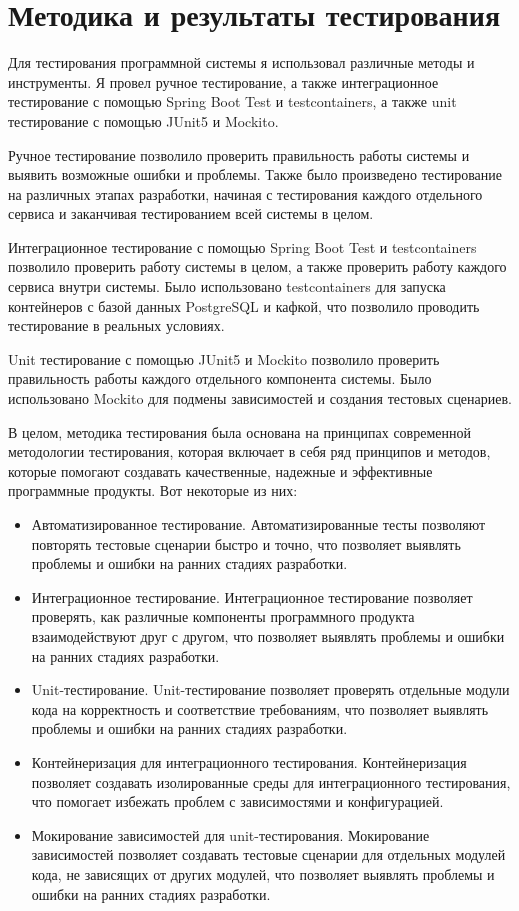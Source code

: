 \section{Методика и результаты тестирования}

Для тестирования программной системы я использовал различные методы и инструменты. Я провел ручное тестирование, а также интеграционное тестирование с помощью Spring Boot Test и testcontainers, а также unit тестирование с помощью JUnit5 и Mockito.

Ручное тестирование позволило проверить правильность работы системы и выявить возможные ошибки и проблемы. Также было произведено тестирование на различных этапах разработки, начиная с тестирования каждого отдельного сервиса и заканчивая тестированием всей системы в целом.

Интеграционное тестирование с помощью Spring Boot Test и testcontainers позволило проверить работу системы в целом, а также проверить работу каждого сервиса внутри системы. Было использовано testcontainers для запуска контейнеров с базой данных PostgreSQL и кафкой, что позволило проводить тестирование в реальных условиях.

Unit тестирование с помощью JUnit5 и Mockito позволило проверить правильность работы каждого отдельного компонента системы. Было использовано Mockito для подмены зависимостей и создания тестовых сценариев.

В целом, методика тестирования была основана на принципах современной методологии тестирования, которая включает
в себя ряд принципов и методов,
которые помогают создавать качественные, надежные и эффективные программные
продукты. Вот некоторые из них:

\begin{itemize}
    \item Автоматизированное тестирование. Автоматизированные тесты позволяют повторять тестовые сценарии быстро и точно, что позволяет выявлять проблемы и ошибки на ранних стадиях разработки.
    \item Интеграционное тестирование. Интеграционное тестирование позволяет проверять, как различные компоненты программного продукта взаимодействуют друг с другом, что позволяет выявлять проблемы и ошибки на ранних стадиях разработки.
    \item Unit-тестирование. Unit-тестирование позволяет проверять отдельные модули кода на корректность и соответствие требованиям, что позволяет выявлять проблемы и ошибки на ранних стадиях разработки.
    \item Контейнеризация для интеграционного тестирования. Контейнеризация позволяет создавать изолированные среды для интеграционного тестирования, что помогает избежать проблем с зависимостями и конфигурацией.
    \item Мокирование зависимостей для unit-тестирования. Мокирование зависимостей позволяет создавать тестовые сценарии для отдельных модулей кода, не зависящих от других модулей, что позволяет выявлять проблемы и ошибки на ранних стадиях разработки.
\end{itemize}

